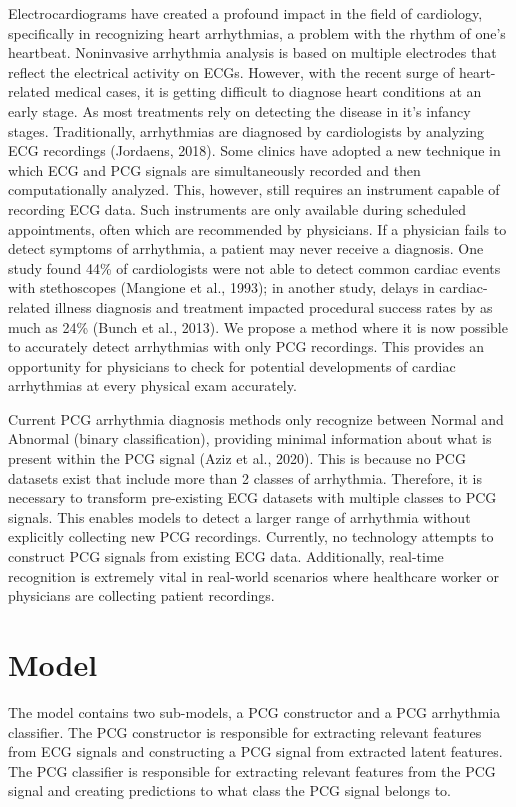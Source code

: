 \documentclass{article}
\begin{document}
Electrocardiograms have created a profound impact in the field of cardiology, specifically in recognizing heart arrhythmias, a problem with the rhythm of one’s heartbeat. Noninvasive arrhythmia analysis is based on multiple electrodes that reflect the electrical activity on ECGs. However, with the recent surge of heart-related medical cases, it is getting difficult to diagnose heart conditions at an early stage. As most treatments rely on detecting the disease in it's infancy stages. Traditionally, arrhythmias are diagnosed by cardiologists by analyzing ECG recordings (Jordaens, 2018). Some clinics have adopted a new technique in which ECG and PCG signals are simultaneously recorded and then computationally analyzed. This, however, still requires an instrument capable of recording ECG data. Such instruments are only available during scheduled appointments, often which are recommended by physicians.
If a physician fails to detect symptoms of arrhythmia, a patient may never receive a diagnosis. One study found 44\% of cardiologists were not able to detect common cardiac events with stethoscopes (Mangione et al., 1993); in another study, delays in cardiac-related illness diagnosis and treatment impacted procedural success rates by as much as 24\% (Bunch et al., 2013). We propose a method where it is now possible to accurately detect arrhythmias with only PCG recordings. This provides an opportunity for physicians to check for potential developments of cardiac arrhythmias at every physical exam accurately.

Current PCG arrhythmia diagnosis methods only recognize between Normal and Abnormal (binary classification), providing minimal information about what is present within the PCG signal (Aziz et al., 2020). This is because no PCG datasets exist that include more than 2 classes of arrhythmia. Therefore, it is necessary to transform pre-existing ECG datasets with multiple classes to PCG signals. This enables models to detect a larger range of arrhythmia without explicitly collecting new PCG recordings. Currently, no technology attempts to construct PCG signals from existing ECG data. Additionally, real-time recognition is extremely vital in real-world scenarios where healthcare worker or physicians are collecting patient recordings.

\section{Model}
The model contains two sub-models, a PCG constructor and a PCG arrhythmia classifier. The PCG constructor is responsible for extracting relevant features from ECG signals and constructing a PCG signal from extracted latent features. The PCG classifier is responsible for extracting relevant features from the PCG signal and creating predictions to what class the PCG signal belongs to.
\end{document}
